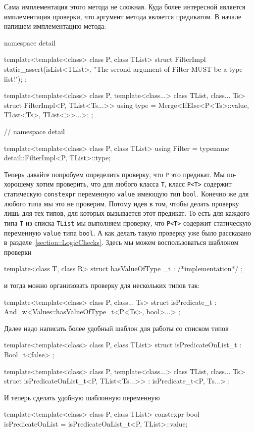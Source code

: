 Сама имплементация этого метода не сложная.
Куда более интересной является имплементация проверки, что аргумент метода является предикатом.
В начале напишем имплементацию метода:
\begin{cppcode}
namespace detail {

template<template<class> class P, class TList>
struct FilterImpl {
  static_assert(isList<TList>, "The second argument of Filter MUST be a type list!");
};

template<template<class> class P, template<class...> class TList, class... Ts>
struct FilterImpl<P, TList<Ts...>> {
  using type = Merge<IfElse<P<Ts>::value, TList<Ts>, TList<>>...>;
};
} // namespace detail

template<template<class> class P, class TList>
using Filter = typename detail::FilterImpl<P, TList>::type;
\end{cppcode}
Теперь давайте попробуем определить проверку, что \verb"P" это предикат.
Мы по-хорошему хотим проверить, что для любого класса \verb"T", класс \verb"P<T>" содержит статическую \verb"constexpr" переменную \verb"value" имеющую тип \verb"bool".
Конечно же для любого типа мы это не проверим.
Потому идея в том, чтобы делать проверку лишь для тех типов, для которых вызывается этот предикат.
То есть для каждого типа \verb"T" из списка \verb"TList" мы выполняем проверку, что \verb"P<T>" содержит статическую переменную \verb"value" типа \verb"bool".
А как делать такую проверку уже было рассказано в разделе~\ref{section::LogicChecks}.
Здесь мы можем воспользоваться шаблоном проверки
\begin{cppcode}
template<class T, class R>
struct hasValueOfType _t : /*implementation*/ {};
\end{cppcode}
и тогда можно организовать проверку для нескольких типов так:
\begin{cppcode}
template<template<class> class P, class... Ts>
struct isPredicate_t : And_w<Values::hasValueOfType_t<P<Ts>, bool>...> {};
\end{cppcode}
Далее надо написать более удобный шаблон для работы со списком типов
\begin{cppcode}
template<template<class> class P, class TList>
struct isPredicateOnList_t : Bool_t<false> {};

template<template<class> class P, template<class...> class TList, class... Ts>
struct isPredicateOnList_t<P, TList<Ts...>> : isPredicate_t<P, Ts...> {};
\end{cppcode}
И теперь сделать удобную шаблонную переменную
\begin{cppcode}
template<template<class> class P, class TList>
constexpr bool isPredicateOnList = isPredicateOnList_t<P, TList>::value;
\end{cppcode}
